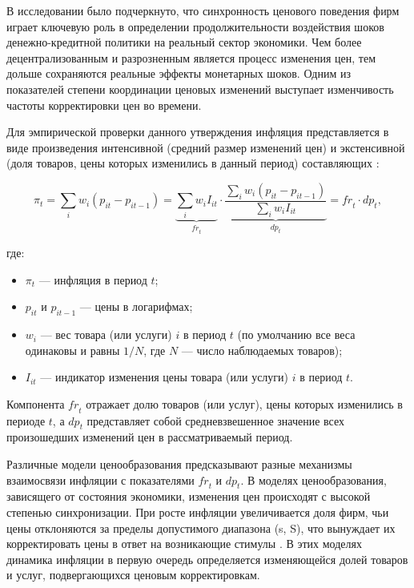 В исследовании \cite{Taylor1980} было подчеркнуто, что синхронность ценового поведения фирм играет ключевую роль в определении продолжительности воздействия шоков денежно-кредитной политики на реальный сектор экономики. Чем более децентрализованным и разрозненным является процесс изменения цен, тем дольше сохраняются реальные эффекты монетарных шоков. Одним из показателей степени координации ценовых изменений выступает изменчивость частоты корректировки цен во времени. 

Для эмпирической проверки данного утверждения инфляция представляется в виде произведения интенсивной (средний размер изменений цен) и экстенсивной (доля товаров, цены которых изменились в данный период) составляющих \cite{klenow2008state}:

\begin{equation}
	\pi_t = \sum_{i} w_i (p_{it} - p_{it-1}) 
	= \underbrace{\sum_{i} w_i I_{it}}_{\mathit{fr}_t}
	\cdot 
	\underbrace{\frac{\sum_{i} w_i (p_{it} - p_{it-1})}{\sum_{i} w_i I_{it}}}_{\mathit{dp}_t}
	= \mathit{fr}_t \cdot \mathit{dp}_t,
	\label{eq:inflation_decomposition}
\end{equation}

где:
\begin{itemize}
	\item $\pi_t$ — инфляция в период $t$;
	\item $p_{it}$ и $p_{it-1}$ — цены в логарифмах;
	\item $w_i$ — вес товара (или услуги) $i$ в период $t$ (по умолчанию все веса одинаковы и равны $1/N$, где $N$ — число наблюдаемых товаров);
	\item $I_{it}$ — индикатор изменения цены товара (или услуги) $i$ в период $t$.
\end{itemize}

Компонента $\mathit{fr}_t$ отражает долю товаров (или услуг), цены которых изменились в периоде $t$, а $\mathit{dp}_t$ представляет собой средневзвешенное значение всех произошедших изменений цен в рассматриваемый период.

Различные модели ценообразования предсказывают разные механизмы взаимосвязи инфляции с показателями $\mathit{fr}_t$ и $\mathit{dp}_t$. В моделях ценообразования, зависящего от состояния экономики, изменения цен происходят с высокой степенью синхронизации. При росте инфляции увеличивается доля фирм, чьи цены отклоняются за пределы допустимого диапазона (s, S), что вынуждает их корректировать цены в ответ на возникающие стимулы \cite{CaplinSpulber1987, golosov2007}. В этих моделях динамика инфляции в первую очередь определяется изменяющейся долей товаров и услуг, подвергающихся ценовым корректировкам.

